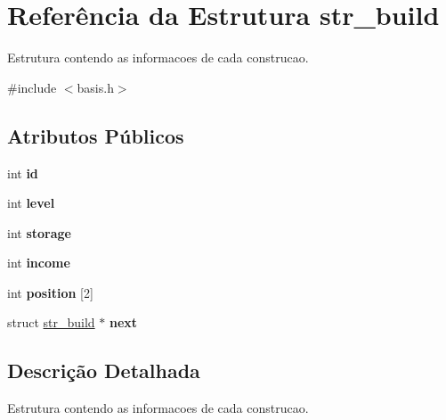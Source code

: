 \hypertarget{structstr__build}{\section{\-Referência da \-Estrutura str\-\_\-build}
\label{structstr__build}
}


\-Estrutura contendo as informacoes de cada construcao.  




{\ttfamily \#include $<$basis.\-h$>$}

\subsection*{\-Atributos \-Públicos}
\begin{DoxyCompactItemize}
\item 
\hypertarget{structstr__build_ae95c1fda9865ad38f6ea18028235e9aa}{int {\bfseries id}}\label{structstr__build_ae95c1fda9865ad38f6ea18028235e9aa}

\item 
\hypertarget{structstr__build_a9808e40c32b7673db041f3b9e06681d2}{int {\bfseries level}}\label{structstr__build_a9808e40c32b7673db041f3b9e06681d2}

\item 
\hypertarget{structstr__build_a7178d795118ae54e5ea021706b0e98fd}{int {\bfseries storage}}\label{structstr__build_a7178d795118ae54e5ea021706b0e98fd}

\item 
\hypertarget{structstr__build_af3618a581d7b37b1ee6305b2ca62ba73}{int {\bfseries income}}\label{structstr__build_af3618a581d7b37b1ee6305b2ca62ba73}

\item 
\hypertarget{structstr__build_aa0af01f1de07238c20812c98dc1e9d94}{int {\bfseries position} \mbox{[}2\mbox{]}}\label{structstr__build_aa0af01f1de07238c20812c98dc1e9d94}

\item 
\hypertarget{structstr__build_a8acdafacbabcd7c0bea64b16f63c4299}{struct \hyperlink{structstr__build}{str\-\_\-build} $\ast$ {\bfseries next}}\label{structstr__build_a8acdafacbabcd7c0bea64b16f63c4299}

\end{DoxyCompactItemize}


\subsection{\-Descrição \-Detalhada}
\-Estrutura contendo as informacoes de cada construcao. 


